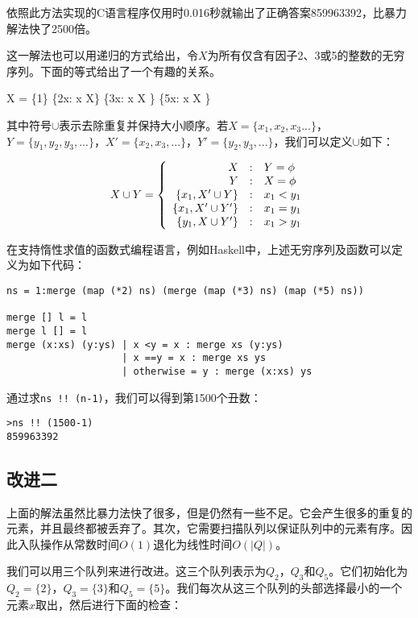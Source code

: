\documentclass[UTF8]{article}
\begin{document}
依照此方法实现的C语言程序仅用时0.016秒就输出了正确答案859963392，比暴力解法快了2500倍。

这一解法也可以用递归的方式给出，令$X$为所有仅含有因子2、3或5的整数的无穷序列。下面的等式给出了一个有趣的关系。

\be
  X = \{1\} \cup \{2x: \forall x \in X\} \cup \{3x: \forall x \in X \} \cup \{5x: \forall x \in X \}
\ee

其中符号$\cup$表示去除重复并保持大小顺序。若$X=\{x_1, x_2, x_3...\}$，$Y=\{y_1, y_2, y_3, ...\}$，$X' = \{x_2, x_3, ...\}$，$Y'=\{y_2, y_3, ...\}$，我们可以定义$\cup$如下：

\[
X \cup Y = \left \{
  \begin{array}{r@{\quad:\quad}l}
  X & Y = \phi \\
  Y & X = \phi \\
  \{ x_1, X' \cup Y \} & x_1 < y_1 \\
  \{ x_1, X' \cup Y' \} & x_1 = y_1 \\
  \{ y_1, X \cup Y' \} & x_1 > y_1
  \end{array}
\right.
\]

在支持惰性求值的函数式编程语言，例如Haskell中，上述无穷序列及函数可以定义为如下代码：

\lstset{language=Haskell}
\begin{lstlisting}
ns = 1:merge (map (*2) ns) (merge (map (*3) ns) (map (*5) ns))

merge [] l = l
merge l [] = l
merge (x:xs) (y:ys) | x <y = x : merge xs (y:ys)
                    | x ==y = x : merge xs ys
                    | otherwise = y : merge (x:xs) ys
\end{lstlisting}

通过求\texttt{ns !! (n-1)}，我们可以得到第1500个丑数：

\begin{verbatim}
>ns !! (1500-1)
859963392
\end{verbatim}

\subsection{改进二}
上面的解法虽然比暴力法快了很多，但是仍然有一些不足。它会产生很多的重复的元素，并且最终都被丢弃了。其次，它需要扫描队列以保证队列中的元素有序。因此入队操作从常数时间$O(1)$退化为线性时间$O(|Q|)$。

我们可以用三个队列来进行改进。这三个队列表示为$Q_2$，$Q_3$和$Q_5$。它们初始化为$Q_2=\{ 2 \}$，$Q_3 = \{ 3\}$和$Q_5 = \{ 5 \}$。我们每次从这三个队列的头部选择最小的一个元素$x$取出，然后进行下面的检查：
\end{document}
